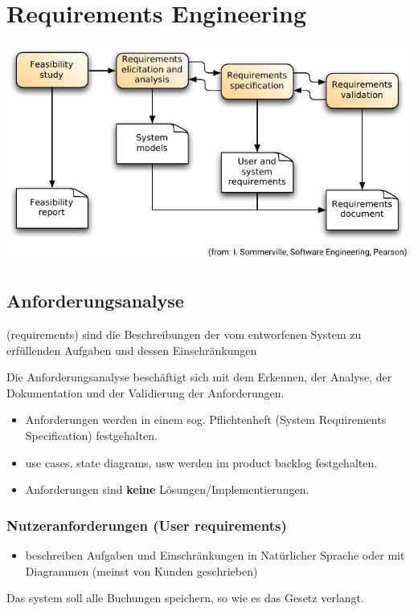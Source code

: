 \documentclass[ngerman]{tuda_summary}
\begin{document}
\section{Requirements Engineering}
\includegraphics{bilder/Requirements engineering Process Flow.pdf}
{\centering
    \subsection{Anforderungsanalyse}
}
\begin{definition}[Anforderungen]
    (requirements) sind die Beschreibungen der vom entworfenen System zu erfüllenden Aufgaben und dessen Einschränkungen
\end{definition}
Die Anforderungsanalyse beschäftigt sich mit dem Erkennen, der Analyse, der Dokumentation und der Validierung der Anforderungen.
\begin{itemize}
    \item Anforderungen werden in einem sog. Pflichtenheft (System Requirements Specification) festgehalten.
    \item use cases, state diagrams, usw werden im product backlog festgehalten.
    \item Anforderungen sind \textbf{keine} Lösungen/Implementierungen.
\end{itemize}
\subsubsection{Nutzeranforderungen (User requirements)}
\begin{itemize}
    \item beschreiben Aufgaben und Einschränkungen in Natürlicher Sprache oder mit Diagrammen (meinst von Kunden geschrieben)
\end{itemize}
 Das system soll alle Buchungen speichern, so wie es das Gesetz verlangt.
\end{document}
